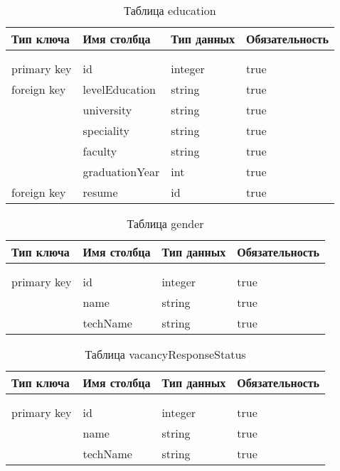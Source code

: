 \begin{xltabular}{\textwidth}{|l|l|p{1.7cm}|X|}
	\caption{Таблица education \label{education:table}}\\ \hline
	\centrow Тип ключа & \centrow Имя столбца & \centrow Тип
	данных & \centrow Обязательность \\ \hline
	 &  &  &  \\ \hline
	\endfirsthead
	 &  &  &  \\ \hline
	\finishhead
	primary key & id & integer & true \\ \hline 
	foreign key	& levelEducation & string & true \\ \hline 
		& university & string & true \\ \hline 
		& speciality & string & true \\ \hline 
		& faculty & string & true \\ \hline 
		& graduationYear & int & true \\ \hline 
		foreign key	& resume & id & true \\ \hline 
\end{xltabular}

\begin{xltabular}{\textwidth}{|l|l|p{1.7cm}|X|}
	\caption{Таблица gender \label{gender:table}}\\ \hline
	\centrow Тип ключа & \centrow Имя столбца & \centrow Тип
	данных & \centrow Обязательность \\ \hline
	 &  &  &  \\ \hline
	\endfirsthead
	 &  &  &  \\ \hline
	\finishhead
	primary key & id & integer & true \\ \hline 
	& name & string & true \\ \hline 
	& techName & string & true \\ \hline 
\end{xltabular}

\begin{xltabular}{\textwidth}{|l|l|p{1.7cm}|X|}
	\caption{Таблица vacancyResponseStatus \label{vacancyResponseStatus:table}}\\ \hline
	\centrow Тип ключа & \centrow Имя столбца & \centrow Тип
	данных & \centrow Обязательность \\ \hline
	 &  &  &  \\ \hline
	\endfirsthead
	 &  &  &  \\ \hline
	\finishhead
	primary key & id & integer & true \\ \hline 
	& name & string & true \\ \hline 
	& techName & string & true \\ \hline 
\end{xltabular}

